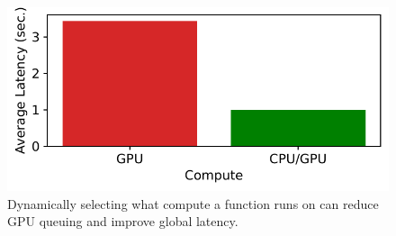 \begin{figure}
  \centering
  \includegraphics{mqfq/graphs/polymorphic/25.7/compute_compare_squish_focused.pdf}
  \caption{Dynamically selecting what compute a function runs on can reduce GPU queuing and improve global latency.}
  \label{fig:poly}
\end{figure}

